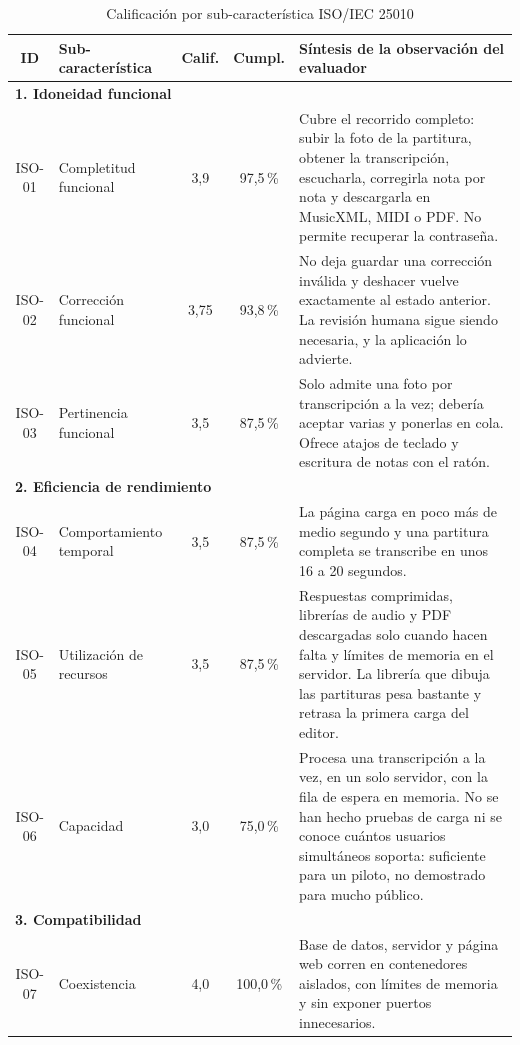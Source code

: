 \documentclass[conference]{IEEEtran}
\begin{document}
\begin{table}[htbp]
\caption{Calificación por sub-característica ISO/IEC 25010}
\label{tab:items-iso}
\centering
\scriptsize
\renewcommand{\arraystretch}{1.12}
\begin{tabular}{|c|p{2.8cm}|c|c|p{9.9cm}|}
\hline
\textbf{ID} & \textbf{Sub-característica} & \textbf{Calif.} & \textbf{Cumpl.} & \textbf{Síntesis de la observación del evaluador} \\
\hline
\multicolumn{5}{|l|}{\textbf{1. Idoneidad funcional}} \\
\hline
ISO-01 & Completitud funcional & 3,9 & 97,5\,\% & Cubre el recorrido completo: subir la foto de la partitura, obtener la transcripción, escucharla, corregirla nota por nota y descargarla en MusicXML, MIDI o PDF. No permite recuperar la contraseña. \\
\hline
ISO-02 & Corrección funcional & 3,75 & 93,8\,\% & No deja guardar una corrección inválida y deshacer vuelve exactamente al estado anterior. La revisión humana sigue siendo necesaria, y la aplicación lo advierte. \\
\hline
ISO-03 & Pertinencia funcional & 3,5 & 87,5\,\% & Solo admite una foto por transcripción a la vez; debería aceptar varias y ponerlas en cola. Ofrece atajos de teclado y escritura de notas con el ratón. \\
\hline
\multicolumn{5}{|l|}{\textbf{2. Eficiencia de rendimiento}} \\
\hline
ISO-04 & Comportamiento temporal & 3,5 & 87,5\,\% & La página carga en poco más de medio segundo y una partitura completa se transcribe en unos 16 a 20 segundos. \\
\hline
ISO-05 & Utilización de recursos & 3,5 & 87,5\,\% & Respuestas comprimidas, librerías de audio y PDF descargadas solo cuando hacen falta y límites de memoria en el servidor. La librería que dibuja las partituras pesa bastante y retrasa la primera carga del editor. \\
\hline
ISO-06 & Capacidad & 3,0 & 75,0\,\% & Procesa una transcripción a la vez, en un solo servidor, con la fila de espera en memoria. No se han hecho pruebas de carga ni se conoce cuántos usuarios simultáneos soporta: suficiente para un piloto, no demostrado para mucho público. \\
\hline
\multicolumn{5}{|l|}{\textbf{3. Compatibilidad}} \\
\hline
ISO-07 & Coexistencia & 4,0 & 100,0\,\% & Base de datos, servidor y página web corren en contenedores aislados, con límites de memoria y sin exponer puertos innecesarios. \\

\end{tabular}
\end{table}
\end{document}
